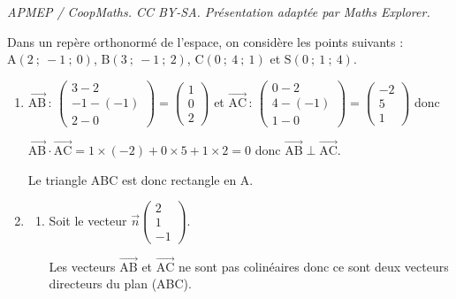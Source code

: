 \documentclass[10pt]{article}
\providecommand{\vect}[1]{\overrightarrow{#1}}
\providecommand{\vectt}[1]{\overrightarrow{\mathrm{#1}}}
\begin{document}
\noindent\textit{APMEP / CoopMaths. CC BY-SA. Présentation adaptée par Maths Explorer.}\par\medskip
\medskip

Dans un repère orthonormé de l'espace, on considère les points suivants : \hfill{}$\text{A}(2~;~-1~;~0)$, $\text{B}(3~;~-1~;~2)$, $\text{C}(0~;~4~;~1)$ et $\text{S} (0~;~1~;~4)$.\hfill{}

\smallskip

\begin{enumerate}
\item 
$\vectt{AB}\,:\,
\begin{pmatrix}
3-2 \\-1-(-1)\\2-0
\end{pmatrix}
=
\begin{pmatrix}
1\\0\\2
\end{pmatrix}$
et
$\vectt{AC}\,:\,
\begin{pmatrix}
0-2 \\4-(-1)\\1-0
\end{pmatrix}
=
\begin{pmatrix}
-2 \\5\\1
\end{pmatrix}
$
donc

$\vectt{AB}\cdot \vectt{AC} = 1\times (-2) + 0\times 5 + 1 \times 2 = 0$
donc
$\vectt{AB}\perp \vectt{AC}$.

Le triangle ABC est donc rectangle en A.

\item  
	\begin{enumerate}
		\item Soit le vecteur $\vect{n}\begin{pmatrix}2\\1\\- 1\end{pmatrix}$.

Les vecteurs $\vectt{AB}$ et $\vectt{AC}$ ne sont pas colinéaires donc ce sont deux vecteurs directeurs du plan (ABC).
		
		

\end{enumerate}
\end{enumerate}
\end{document}
